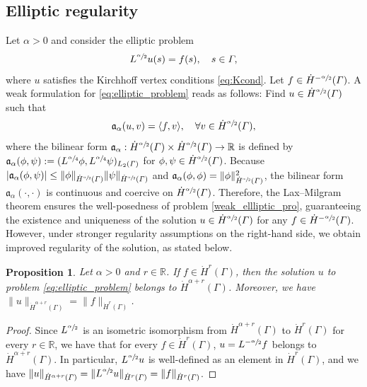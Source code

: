 \documentclass[numbers,webpdf]{ima-authoring-template}%
\theoremstyle{thmstyletwo}%
\newtheorem{proposition}[theorem]{Proposition}%
\numberwithin{equation}{section}
\begin{document}
\subsection{Elliptic regularity}
Let $\alpha>0$ and consider the elliptic problem
\begin{align}
    \label{eq:elliptic_problem}
    L^{\sfrac{\alpha}{2}} u(s)=f(s),\quad s\in{\mit\varGamma},
\end{align}
where $u$ satisfies the Kirchhoff vertex conditions \eqref{eq:Kcond}. Let $f\in\dot{H}^{-\sfrac{\alpha}{2}}({\mit\varGamma})$. A weak formulation for \eqref{eq:elliptic_problem} reads as follows: Find $u\in\dot{H}^{\sfrac{\alpha}{2}}({\mit\varGamma})$ such that
\begin{align}
\label{weak_ellliptic_pro}
    \mathfrak{a}_{\alpha}(u, v) = \langle f,v\rangle,\quad \forall v\in \dot{H}^{\sfrac{\alpha}{2}}({\mit\varGamma}),
\end{align}
where the bilinear form $\mathfrak{a}_{\alpha}:\dot{H}^{\sfrac{\alpha}{2}}({\mit\varGamma})\times \dot{H}^{\sfrac{\alpha}{2}}({\mit\varGamma})\to \mathbb{R}$ is defined by $\mathfrak{a}_{\alpha}(\phi,\psi) := (L^{\sfrac{\alpha}{4}}\phi,L^{\sfrac{\alpha}{4}}\psi)_{L_2({\mit\varGamma})}$ for $\phi,\psi\in\dot{H}^{\sfrac{\alpha}{2}}({\mit\varGamma})$. Because $|\mathfrak{a}_{\alpha}(\phi,\psi)|\leq \|\phi\|_{\dot{H}^{\sfrac{\alpha}{2}}({\mit\varGamma})}\|\psi\|_{\dot{H}^{\sfrac{\alpha}{2}}({\mit\varGamma})}$ and $\mathfrak{a}_{\alpha}(\phi,\phi) = \|\phi\|^2_{\dot{H}^{\sfrac{\alpha}{2}}({\mit\varGamma})}$, the bilinear form $\mathfrak{a}_{\alpha}(\cdot,\cdot)$ is continuous and coercive on $\dot{H}^{\sfrac{\alpha}{2}}({\mit\varGamma})$. Therefore, the Lax--Milgram theorem ensures the well-posedness of problem \eqref{weak_ellliptic_pro}, guaranteeing the existence and uniqueness of the solution $u\in \dot{H}^{\sfrac{\alpha}{2}}({\mit\varGamma})$ for any $f \in \dot{H}^{-{\sfrac{\alpha}{2}}}({\mit\varGamma})$. However, under stronger regularity assumptions on the right-hand side, we obtain improved regularity of the solution, as stated below.
\begin{proposition}
\label{proposition:elliptic_regularity}
    Let $\alpha>0$ and $r\in\mathbb{R}$. If $f\in\dot{H}^{r}(\Gamma)$, then the solution $u$ to problem \eqref{eq:elliptic_problem} belongs to $\dot{H}^{\alpha+r}(\Gamma)$. Moreover, we have $\|u\|_{\dot{H}^{\alpha+r}(\Gamma)} = \|f\|_{\dot{H}^{r}(\Gamma)}$.
\end{proposition}
\begin{proof}
    Since $L^{\sfrac{\alpha}{2}}$ is an isometric isomorphism from $\dot{H}^{\alpha+r}(\Gamma)$ to $ \dot{H}^{r}(\Gamma)$ for every $r\in\mathbb{R}$, we have that for every $f\in\dot{H}^{r}(\Gamma)$, $u = L^{-\sfrac{\alpha}{2}} f$ belongs to $\dot{H}^{\alpha+r}(\Gamma)$. In particular, $L^{\sfrac{\alpha}{2}} u$ is well-defined as an element in $\dot{H}^r(\Gamma)$, and we have $\|u\|_{\dot{H}^{\alpha+r}({\mit\varGamma})} = \|L^{\sfrac{\alpha}{2}}u\|_{\dot{H}^{r}({\mit\varGamma})}= \|f\|_{\dot{H}^{r}({\mit\varGamma})}$.
    \hfill
\end{proof}
\end{document}
